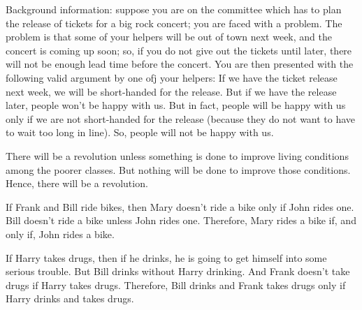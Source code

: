 \begin{enumerate}
\begin{statement} {Background information: suppose you are on the committee
    which has to plan the release of tickets for a big rock concert; you are
    faced with a problem. The problem is that some of your helpers will be out
    of town next week, and the concert is coming up soon; so, if you do not give
    out the tickets until later, there will not be enough lead time before the
    concert. You are then presented with the following valid argument by one ofj
    your helpers: If we have the ticket release next week, we will be
    short-handed for the release. But if we have the release later, people won't
    be happy with us. But in fact, people will be happy with us only if we are
    not short-handed for the release (because they do not want to have to wait
    too long in line). So, people will not be happy with us.}
\end{statement}

\begin{statement}{There will be a revolution unless something is done to improve
    living conditions among the poorer classes. But nothing will be done to
    improve those conditions. Hence, there will be a revolution.}
\end{statement}

\begin{statement}{If Frank and Bill ride bikes, then Mary doesn't ride a bike
    only if John rides one. Bill doesn't ride a bike unless John rides one.
    Therefore, Mary rides a bike if, and only if, John rides a bike.}
\end{statement}

\begin{statement}{ If Harry takes drugs, then if he drinks, he is going to get
    himself into some serious trouble. But Bill drinks without Harry drinking.
    And Frank doesn't take drugs if Harry takes drugs. Therefore, Bill drinks
    and Frank takes drugs only if Harry drinks and takes drugs.}
\end{statement}


\end{enumerate}
